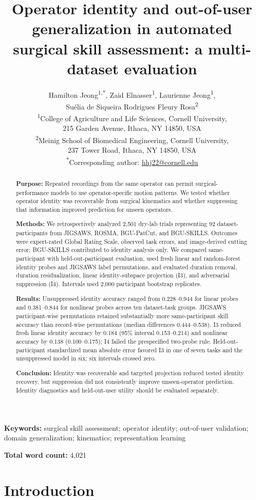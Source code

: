 \documentclass[11pt]{article}
\title{Operator identity and out-of-user generalization in automated surgical skill assessment: a multi-dataset evaluation}
\author{Hamilton Jeong\textsuperscript{1,*}, Zaid Elnasser\textsuperscript{1},
Laurienne Jeong\textsuperscript{1},\\
Su\'elia de Siqueira Rodrigues Fleury Rosa\textsuperscript{2}\\[0.75em]
\small \textsuperscript{1}College of Agriculture and Life Sciences, Cornell University,\\
\small 215 Garden Avenue, Ithaca, NY 14850, USA\\
\small \textsuperscript{2}Meinig School of Biomedical Engineering, Cornell University,\\
\small 237 Tower Road, Ithaca, NY 14850, USA\\[0.5em]
\small \textsuperscript{*}Corresponding author: \href{mailto:hhj22@cornell.edu}{hhj22@cornell.edu}}
\date{}
\begin{document}
\maketitle
\begin{abstract}
\textbf{Purpose:} Repeated recordings from the same operator can permit surgical-performance models to use operator-specific motion patterns. We tested whether operator identity was recoverable from surgical kinematics and whether suppressing that information improved prediction for unseen operators.

\textbf{Methods:} We retrospectively analyzed 2,501 dry-lab trials representing 92 dataset-participants from JIGSAWS, ROSMA, BGU-PatCut, and BGU-SKILLS. Outcomes were expert-rated Global Rating Scale, observed task errors, and image-derived cutting error; BGU-SKILLS contributed to identity analysis only. We compared same-participant with held-out-participant evaluation, used fresh linear and random-forest identity probes and JIGSAWS label permutations, and evaluated duration removal, duration residualization, linear identity-subspace projection (I3), and adversarial suppression (I4). Intervals used 2,000 participant bootstrap replicates.

\textbf{Results:} Unsuppressed identity accuracy ranged from 0.228--0.944 for linear probes and 0.381--0.844 for nonlinear probes across ten dataset-task groups. JIGSAWS participant-wise permutations retained substantially more same-participant skill accuracy than record-wise permutations (median differences 0.444--0.538). I3 reduced fresh linear identity accuracy by 0.184 (95\% interval 0.153--0.214) and nonlinear accuracy by 0.138 (0.100--0.175); I4 failed the prespecified two-probe rule. Held-out-participant standardized mean absolute error favored I3 in one of seven tasks and the unsuppressed model in six; six intervals crossed zero.

\textbf{Conclusion:} Identity was recoverable and targeted projection reduced tested identity recovery, but suppression did not consistently improve unseen-operator prediction. Identity diagnostics and held-out-user utility should be evaluated separately.
\end{abstract}

\noindent\textbf{Keywords:} surgical skill assessment; operator identity; out-of-user validation; domain generalization; kinematics; representation learning

\noindent\textbf{Total word count:} 4,021

\section{Introduction}\label{introduction}
\end{document}
